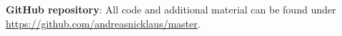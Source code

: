 \documentclass[a4paper, 12pt]{article}
\makeatletter
\renewcommand\listoffigures{%
  \section{\listfigurename}%
  \@mkboth{\MakeUppercase\listfigurename}{\MakeUppercase\listfigurename}%
  \@starttoc{lof}%
}
\makeatother
\begin{document}







\pagebreak

\listoffigures

\pagebreak

\printnoidxglossary[
  type=\acronymtype,
  nonumberlist,
  style=long
]

\pagebreak

{}

\vfill
\textbf{GitHub repository}: All code and additional material can be found under \url{https://github.com/andreasnicklaus/master}.

\pagebreak
\end{document}
